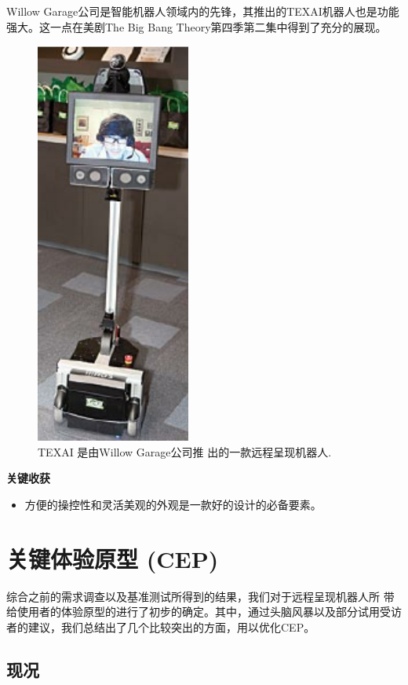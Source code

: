 Willow Garage公司是智能机器人领域内的先锋，其推出的TEXAI机器人也是功能
强大。这一点在美剧The Big Bang Theory第四季第二集中得到了充分的展现。

\begin{figure}[h] 
\centering
                \includegraphics[keepaspectratio, width=2in]{Figures/ch4.texai.jpg}        
        \caption[TEXAI]{TEXAI \textregistered 是由Willow Garage公司推
          出的一款远程呈现机器人.}
\end{figure}

\noindent \textbf{关键收获}
\begin{itemize} \tightlist
\item  方便的操控性和灵活美观的外观是一款好的设计的必备要素。
\end{itemize}

\section{关键体验原型 (CEP)}

综合之前的需求调查以及基准测试所得到的结果，我们对于远程呈现机器人所
带给使用者的体验原型的进行了初步的确定。其中，通过头脑风暴以及部分试用受访
者的建议，我们总结出了几个比较突出的方面，用以优化CEP。

\subsection{现况}

